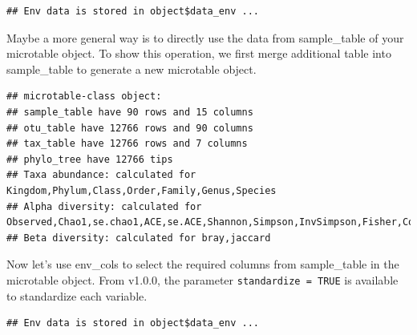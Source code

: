 \documentclass[
]{book}
\newenvironment{Shaded}{\begin{snugshade}}{\end{snugshade}}
\newcommand{\AttributeTok}[1]{\textcolor[rgb]{0.77,0.63,0.00}{#1}}
\newcommand{\CommentTok}[1]{\textcolor[rgb]{0.56,0.35,0.01}{\textit{#1}}}
\newcommand{\DecValTok}[1]{\textcolor[rgb]{0.00,0.00,0.81}{#1}}
\newcommand{\FunctionTok}[1]{\textcolor[rgb]{0.00,0.00,0.00}{#1}}
\newcommand{\NormalTok}[1]{#1}
\newcommand{\OtherTok}[1]{\textcolor[rgb]{0.56,0.35,0.01}{#1}}
\newcommand{\SpecialCharTok}[1]{\textcolor[rgb]{0.00,0.00,0.00}{#1}}
\begin{document}
\begin{verbatim}
## Env data is stored in object$data_env ...
\end{verbatim}

Maybe a more general way is to directly use the data from sample\_table of your microtable object.
To show this operation, we first merge additional table into sample\_table to generate a new microtable object.

\begin{Shaded}
\end{Shaded}

\begin{verbatim}
## microtable-class object:
## sample_table have 90 rows and 15 columns
## otu_table have 12766 rows and 90 columns
## tax_table have 12766 rows and 7 columns
## phylo_tree have 12766 tips
## Taxa abundance: calculated for Kingdom,Phylum,Class,Order,Family,Genus,Species 
## Alpha diversity: calculated for Observed,Chao1,se.chao1,ACE,se.ACE,Shannon,Simpson,InvSimpson,Fisher,Coverage 
## Beta diversity: calculated for bray,jaccard
\end{verbatim}

Now let's use env\_cols to select the required columns from sample\_table in the microtable object.
From v1.0.0, the parameter \texttt{standardize\ =\ TRUE} is available to standardize each variable.

\begin{Shaded}
\end{Shaded}

\begin{verbatim}
## Env data is stored in object$data_env ...
\end{verbatim}
\end{document}
